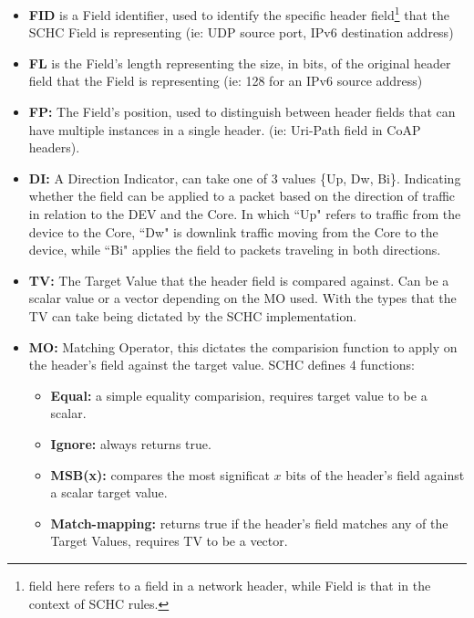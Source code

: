 \documentclass[cspaper]{IEEEtran}
\numberwithin{equation}{subsection}
\begin{document}
	\begin{itemize}
		\item \textbf{FID} is a Field identifier, used to identify the specific header field\footnote{field here refers to a field in 
			a network header, while Field is that in the context of SCHC rules.} that the SCHC Field is representing (ie: UDP source port, IPv6 destination address)


		\item \textbf{FL}
			is the Field's length representing the size, in bits, of the original header field that the Field is representing (ie: 128 for an IPv6 source address)
		\item \textbf{FP:} 
			The Field's position, used to distinguish between header fields that can have multiple instances in a single header. (ie: Uri-Path field in CoAP headers). 

		\item \textbf{DI:} 
			 A Direction Indicator, can take one of 3 values \{Up, Dw, Bi\}. Indicating whether the field can be applied to a packet based on the direction of traffic
			in relation to the DEV and the Core. In which ``Up" refers to traffic from the device to the Core, ``Dw" is downlink traffic moving from
			the Core to the device, while ``Bi" applies the field to packets traveling in both directions.

	\item \textbf{TV:}
			The Target Value that the header field is compared against. Can be a scalar value or a vector depending on the MO used. With the types that the 
			TV can take being dictated by the SCHC implementation.

	\item \textbf{MO:}
			Matching Operator, this dictates the comparision function to apply on the header's field against the target value. SCHC defines 4 functions:
			\begin{adjustwidth}{1em}{0em}
			\begin{itemize}
				\item  \textbf{Equal:} 
						a simple equality comparision, requires target value to be a scalar.
					\item \textbf{Ignore:}
						always returns true.
					\item \textbf{MSB(x):} 
						compares the most significat $x$ bits of the header's field against a scalar target value.
					\item \textbf{Match-mapping:}
					returns true if the header's field matches any of the Target Values, requires TV to be a vector.
			\end{itemize}	
			\end{adjustwidth}	
			


\end{itemize}
\end{document}
